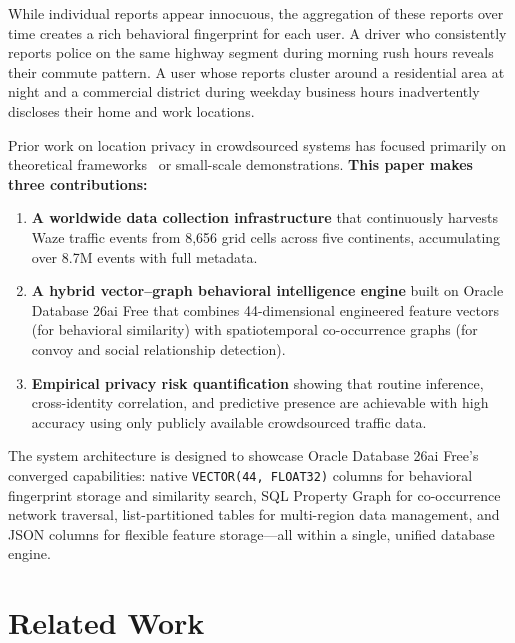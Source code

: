 \documentclass[11pt,a4paper]{article}
\begin{document}
While individual reports appear innocuous, the aggregation of these reports over time creates a rich behavioral fingerprint for each user. A driver who consistently reports police on the same highway segment during morning rush hours reveals their commute pattern. A user whose reports cluster around a residential area at night and a commercial district during weekday business hours inadvertently discloses their home and work locations.

Prior work on location privacy in crowdsourced systems has focused primarily on theoretical frameworks~\cite{krumm2007inference, golle2009anonymity, zang2011anonymity} or small-scale demonstrations. \textbf{This paper makes three contributions:}

\begin{enumerate}
    \item \textbf{A worldwide data collection infrastructure} that continuously harvests Waze traffic events from 8,656 grid cells across five continents, accumulating over 8.7M events with full metadata.

    \item \textbf{A hybrid vector--graph behavioral intelligence engine} built on Oracle Database 26ai Free that combines 44-dimensional engineered feature vectors (for behavioral similarity) with spatiotemporal co-occurrence graphs (for convoy and social relationship detection).

    \item \textbf{Empirical privacy risk quantification} showing that routine inference, cross-identity correlation, and predictive presence are achievable with high accuracy using only publicly available crowdsourced traffic data.
\end{enumerate}

The system architecture is designed to showcase Oracle Database 26ai Free's converged capabilities: native \texttt{VECTOR(44, FLOAT32)} columns for behavioral fingerprint storage and similarity search, SQL Property Graph for co-occurrence network traversal, list-partitioned tables for multi-region data management, and JSON columns for flexible feature storage---all within a single, unified database engine.

\section{Related Work}
\label{sec:related_work}
\end{document}
